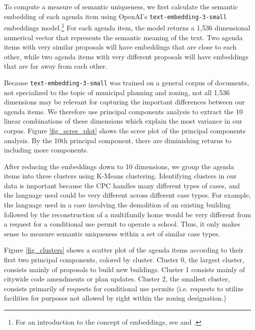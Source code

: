 To compute a measure of semantic uniqueness, we first calculate the semantic embedding of each agenda item using OpenAI's \texttt{text-embedding-3-small} embeddings model.\footnote{For an introduction to the concept of embeddings, see \citet{mikolov2013} and \citet{le2014}.} For each agenda item, the model returns a 1,536 dimensional numerical vector that represents the semantic meaning of the text. Two agenda items with very similar proposals will have embeddings that are close to each other, while two agenda items with very different proposals will have embeddings that are far away from each other. 

Because \texttt{text-embedding-3-small} was trained on a general corpus of documents, not specialized to the topic of municipal planning and zoning, not all 1,536 dimensions may be relevant for capturing the important differences between our agenda items. We therefore use principal components analysis to extract the 10 linear combinations of these dimensions which explain the most variance in our corpus. Figure \ref{fig_scree_plot} shows the scree plot of the principal components analysis. By the 10th principal component, there are diminishing returns to including more components.

After reducing the embeddings down to 10 dimensions, we group the agenda items into three clusters using K-Means clustering. Identifying clusters in our data is important because the CPC handles many different types of cases, and the language used could be very different across different case types. For example, the language used in a case involving the demolition of an existing building followed by the reconstruction of a multifamily home would be very different from a request for a conditional use permit to operate a school. Thus, it only makes sense to measure semantic uniqueness within a set of similar case types.

Figure \ref{fig_clusters} shows a scatter plot of the agenda items according to their first two principal components, colored by cluster. Cluster 0, the largest cluster, consists mainly of proposals to build new buildings. Cluster 1 consists mainly of citywide code amendments or plan updates. Cluster 2, the smallest cluster, consists primarily of requests for conditional use permits (i.e. requests to utilize facilities for purposes not allowed by right within the zoning designation.)

